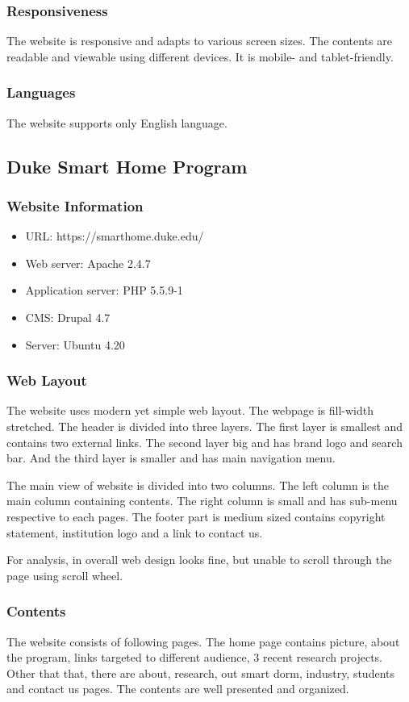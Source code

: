 \subsubsection*{Responsiveness}
The website is responsive and adapts to various screen sizes. The contents are readable and viewable using different devices. It is mobile- and tablet-friendly.

\subsubsection*{Languages}
The website supports only English language.

\subsection{Duke Smart Home Program}
\subsubsection*{Website Information}
\begin{itemize}
\item URL: https://smarthome.duke.edu/
\item Web server: Apache 2.4.7
\item Application server: PHP 5.5.9-1
\item CMS: Drupal 4.7
\item Server: Ubuntu 4.20
\end{itemize}

\subsubsection*{Web Layout}
The website uses modern yet simple web layout. The webpage is fill-width stretched. The header is divided into three layers. The first layer is smallest and contains two external links. The second layer big and has brand logo and search bar. And the third layer is smaller and has main navigation menu.

The main view of website is divided into two columns. The left column is the main column containing contents. The right column is small and has sub-menu respective to each pages. The footer part is medium sized contains copyright statement, institution logo and a link to contact us.

For analysis, in overall web design looks fine, but unable to scroll through the page using scroll wheel.

\subsubsection*{Contents}
The website consists of following pages. The home page contains picture, about the program, links targeted to different audience, 3 recent research projects. Other that that, there are about, research, out smart dorm, industry, students and contact us pages. The contents are well presented and organized.

